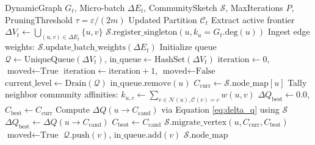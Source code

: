 \documentclass[10pt,journal,compsoc]{IEEEtran}
\begin{document}
\begin{algorithm}[t]
\caption{Adaptive Incremental Louvain (CommunitySketch Accelerated)}
\label{alg:adaptive_louvain}
\begin{algorithmic}[1]
\REQUIRE DynamicGraph $G_t$, Micro-batch $\Delta E_t$, CommunitySketch $\mathcal{S}$, MaxIterations $P$, PruningThreshold $\tau = \varepsilon / (2m)$
\ENSURE Updated Partition $\mathcal{C}_t$
\STATE Extract active frontier $\Delta V_t \leftarrow \bigcup_{(u, v) \in \Delta E_t} \{u, v\}$
        \STATE $\mathcal{S}.\text{register\_singleton}(u, k_u = G_t.\text{deg}(u))$
    \ENDIF
\ENDFOR
\STATE Ingest edge weights: $\mathcal{S}.\text{update\_batch\_weights}(\Delta E_t)$
\STATE Initialize queue $\mathcal{Q} \leftarrow \text{UniqueQueue}(\Delta V_t)$, $\text{in\_queue} \leftarrow \text{HashSet}(\Delta V_t)$
\STATE $\text{iteration} \leftarrow 0$, $\text{moved} \leftarrow \text{True}$
    \STATE $\text{iteration} \leftarrow \text{iteration} + 1$, $\text{moved} \leftarrow \text{False}$
    \STATE $\text{current\_level} \leftarrow \text{Drain}(\mathcal{Q})$
        \STATE $\text{in\_queue}.\text{remove}(u)$
        \STATE $C_{\text{curr}} \leftarrow \mathcal{S}.\text{node\_map}[u]$
        \STATE Tally neighbor community affinities: $k_{u, c} \leftarrow \sum_{v \in \mathcal{N}(u), \mathcal{C}(v)=c} w(u, v)$
        \STATE $\Delta Q_{\text{best}} \leftarrow 0.0$, $C_{\text{best}} \leftarrow C_{\text{curr}}$
            \STATE Compute $\Delta Q(u \to C_{\text{cand}})$ via Equation \eqref{eq:delta_q} using $\mathcal{S}$ 
                \STATE $\Delta Q_{\text{best}} \leftarrow \Delta Q(u \to C_{\text{cand}})$
                \STATE $C_{\text{best}} \leftarrow C_{\text{cand}}$
            \ENDIF
        \ENDFOR
            \STATE $\mathcal{S}.\text{migrate\_vertex}(u, C_{\text{curr}}, C_{\text{best}})$ 
            \STATE $\text{moved} \leftarrow \text{True}$
                    \STATE $\mathcal{Q}.\text{push}(v)$, $\text{in\_queue}.\text{add}(v)$
                \ENDIF
            \ENDFOR
        \ENDIF
    \ENDFOR
\ENDWHILE
\RETURN $\mathcal{S}.\text{node\_map}$
\end{algorithmic}
\end{algorithm}
\end{document}
